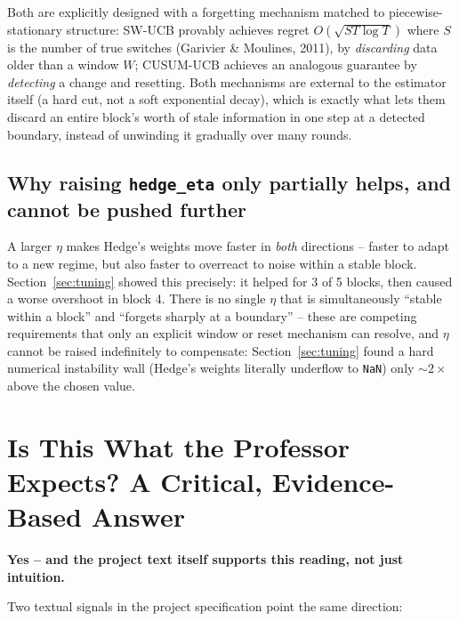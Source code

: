 \documentclass[11pt,a4paper]{article}
\newcommand{\1}{\mathbf{1}}
\begin{document}
Both are explicitly designed with a forgetting mechanism matched to piecewise-stationary structure: SW-UCB provably achieves regret $O(\sqrt{ST\log T})$ where $S$ is the number of true switches (Garivier \& Moulines, 2011), by \emph{discarding} data older than a window $W$; CUSUM-UCB achieves an analogous guarantee by \emph{detecting} a change and resetting. Both mechanisms are external to the estimator itself (a hard cut, not a soft exponential decay), which is exactly what lets them discard an entire block's worth of stale information in one step at a detected boundary, instead of unwinding it gradually over many rounds.

\subsection{Why raising \texttt{hedge\_eta} only partially helps, and cannot be pushed further}

A larger $\eta$ makes Hedge's weights move faster in \emph{both} directions -- faster to adapt to a new regime, but also faster to overreact to noise within a stable block. Section~\ref{sec:tuning} showed this precisely: it helped for 3 of 5 blocks, then caused a worse overshoot in block 4. There is no single $\eta$ that is simultaneously ``stable within a block'' and ``forgets sharply at a boundary'' -- these are competing requirements that only an explicit window or reset mechanism can resolve, and $\eta$ cannot be raised indefinitely to compensate: Section~\ref{sec:tuning} found a hard numerical instability wall (Hedge's weights literally underflow to \texttt{NaN}) only $\sim\!2\times$ above the chosen value.

\section{Is This What the Professor Expects? A Critical, Evidence-Based Answer}

\begin{center}
\colorbox{softgreen}{\parbox{0.94\linewidth}{
\textbf{Yes -- and the project text itself supports this reading, not just intuition.}
}}
\end{center}

Two textual signals in the project specification point the same direction:
\end{document}
